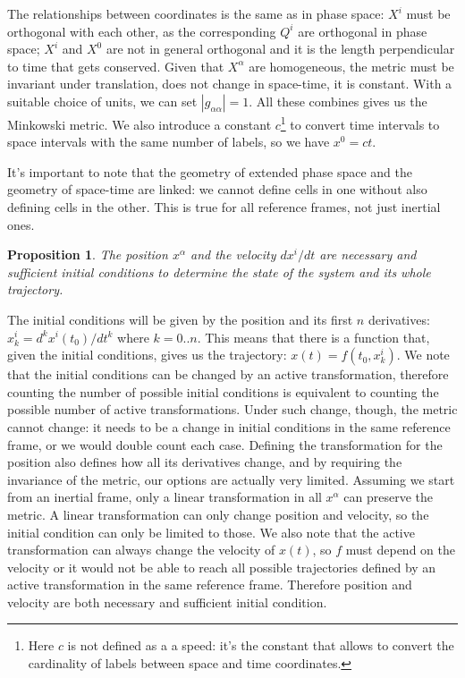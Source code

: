 \documentclass[aps,pra,10pt,twocolumn,floatfix,nofootinbib]{revtex4-1}
\newtheorem{prop}[thm]{Proposition}
\theoremstyle{definition}
\begin{document}
The relationships between coordinates is the same as in phase space: $X^i$ must be orthogonal with each other, as the corresponding $Q^i$ are orthogonal in phase space; $X^i$ and $X^0$ are not in general orthogonal and it is the length perpendicular to time that gets conserved. Given that $X^\alpha$ are homogeneous, the metric must be invariant under translation, does not change in space-time, it is constant. With a suitable choice of units, we can set $|g_{\alpha\alpha}|=1$. All these combines gives us the Minkowski metric. We also introduce a constant $c$\footnote{Here $c$ is not defined as a a speed: it's the constant that allows to convert the cardinality of labels between space and time coordinates.} to convert time intervals to space intervals with the same number of labels, so we have $x^0=ct$.

It's important to note that the geometry of extended phase space and the geometry of space-time are linked: we cannot define cells in one without also defining cells in the other. This is true for all reference frames, not just inertial ones.

\begin{prop}\label{continuousLabels}
The position $x^\alpha$ and the velocity $dx^i/dt$ are necessary and sufficient initial conditions to determine the state of the system and its whole trajectory.
\end{prop}

The initial conditions will be given by the position and its first $n$ derivatives: $x^i_k=d^kx^i(t_0)/dt^k$ where $k=0..n$. This means that there is a function that, given the initial conditions, gives us the trajectory: $x(t)=f(t_0, x^i_k)$. We note that the initial conditions can be changed by an active transformation, therefore counting the number of possible initial conditions is equivalent to counting the possible number of active transformations. Under such change, though, the metric cannot change: it needs to be a change in initial conditions in the same reference frame, or we would double count each case. Defining the transformation for the position also defines how all its derivatives change, and by requiring the invariance of the metric, our options are actually very limited. Assuming we start from an inertial frame, only a linear transformation in all $x^\alpha$ can preserve the metric. A linear transformation can only change position and velocity, so the initial condition can only be limited to those. We also note that the active transformation can always change the velocity of $x(t)$, so $f$ must depend on the velocity or it would not be able to reach all possible trajectories defined by an active transformation in the same reference frame. Therefore position and velocity are both necessary and sufficient initial condition.
\end{document}
